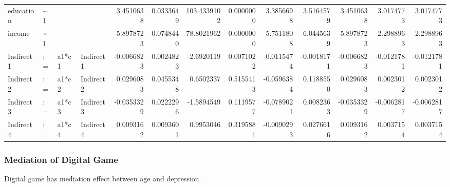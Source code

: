 \documentclass[
]{article}
\begin{document}
\begin{table}[!h]
\begin{tabular}[t]{llllrrrrrrrrr}
\addlinespace
education & \textasciitilde{}1 &  &  & 3.4510638 & 0.0333649 & 103.4339102 & 0.0000000 & 3.3856698 & 3.5164579 & 3.4510638 & 3.0174773 & 3.0174773\\
income & \textasciitilde{}1 &  &  & 5.8978723 & 0.0748440 & 78.8021962 & 0.0000000 & 5.7511808 & 6.0445639 & 5.8978723 & 2.2988963 & 2.2988963\\
Indirect1 & := & a1*c1 & Indirect1 & -0.0066823 & 0.0024823 & -2.6920119 & 0.0071022 & -0.0115474 & -0.0018171 & -0.0066823 & -0.0121781 & -0.0121781\\
Indirect2 & := & a1*c2 & Indirect2 & 0.0296083 & 0.0455348 & 0.6502337 & 0.5155413 & -0.0596384 & 0.1188550 & 0.0296083 & 0.0023012 & 0.0023012\\
Indirect3 & := & a1*c3 & Indirect3 & -0.0353329 & 0.0222296 & -1.5894549 & 0.1119577 & -0.0789021 & 0.0082363 & -0.0353329 & -0.0062817 & -0.0062817\\
\addlinespace
Indirect4 & := & a1*c4 & Indirect4 & 0.0093162 & 0.0093601 & 0.9953046 & 0.3195881 & -0.0090293 & 0.0276616 & 0.0093162 & 0.0037154 & 0.0037154\\
\bottomrule
\end{tabular}
\end{table}

\newpage

\hypertarget{mediation-of-digital-game}{%
\subsubsection{Mediation of Digital
Game}\label{mediation-of-digital-game}}

Digital game has mediation effect between age and depression.
\end{document}
